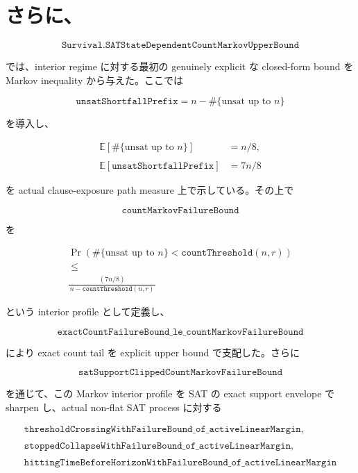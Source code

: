 \documentclass[12pt,a4paper]{article}
\begin{document}
\section{さらに、}\label{ux3055ux3089ux306b-26}

\[
\texttt{Survival.SATStateDependentCountMarkovUpperBound}
\]

では、interior regime に対する最初の genuinely explicit な closed-form bound を Markov inequality から与えた。ここでは

\[
\texttt{unsatShortfallPrefix}=n-\#\{\text{unsat up to }n\}
\]

を導入し、

\[
\begin{aligned}
\mathbb E[\#\{\text{unsat up to }n\}]&=n/8, \\
\qquad \\
\mathbb E[\texttt{unsatShortfallPrefix}]&=7n/8
\end{aligned}
\]

を actual clause-exposure path measure 上で示している。その上で

\[
\texttt{countMarkovFailureBound}
\]

を

\[
\begin{aligned}
\Pr(\#\{\text{unsat up to }n\}<\texttt{countThreshold}(n,r)) \\
\;\le\; \\
\frac{(7n/8)}{\,n-\texttt{countThreshold}(n,r)\,}
\end{aligned}
\]

という interior profile として定義し、

\[
\texttt{exactCountFailureBound\_le\_countMarkovFailureBound}
\]

により exact count tail を explicit upper bound で支配した。さらに

\[
\texttt{satSupportClippedCountMarkovFailureBound}
\]

を通じて、この Markov interior profile を SAT の exact support envelope で sharpen し、actual non-flat SAT process に対する

\[
\begin{aligned}
\texttt{thresholdCrossingWithFailureBound\_of\_activeLinearMargin}, \\
\quad \\
\texttt{stoppedCollapseWithFailureBound\_of\_activeLinearMargin}, \\
\quad \\
\texttt{hittingTimeBeforeHorizonWithFailureBound\_of\_activeLinearMargin}
\end{aligned}
\]
\end{document}
